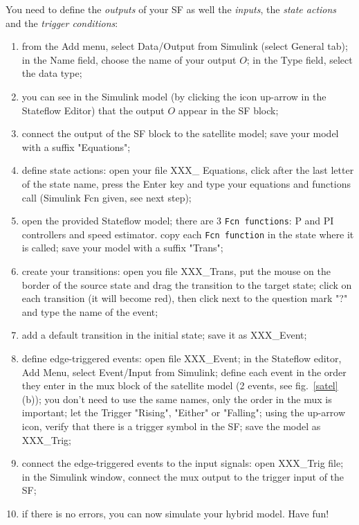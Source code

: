\documentclass[a4paper]{article}
\begin{document}
You need to define the \emph{outputs} of your SF as well the \emph{inputs}, 
the \emph{state actions} and the \emph{trigger conditions}:
\begin{enumerate}
\item from the Add menu, select Data/Output from Simulink (select General tab); in the Name field,
	choose the name of your output $O$; in the Type field, select the data type;%
\item you can see in the Simulink model (by clicking the icon up-arrow in the Stateflow Editor)
	that the output $O$ appear in the SF block;
\item connect the output of the SF block to the satellite model;%
	save your model with a suffix "Equations";
\item define state actions: open your file XXX\_ Equations, click after the last letter of the
	state name, press the Enter key and type your equations and functions call (Simulink Fcn given,
	see next step);
\item open the  provided Stateflow model; there are 3 {\tt Fcn functions}: P and PI controllers and 
	speed estimator. copy each {\tt Fcn function} in the state where it is called;
	save your model with a suffix "Trans";
\item create your transitions: open you file XXX\_Trans, put the mouse on the border of the source
	state and drag the transition to the target state;%
	click on each transition (it will become red), then click next to the question mark "?" and
	type the name of the event;%
\item add a default transition in the initial state;%
	save it as XXX\_Event;
\item define edge-triggered events: open file XXX\_Event; in the Stateflow editor, Add Menu, 
	select Event/Input from Simulink;%
	define each event in the order they enter in the mux block of the satellite model (2 events,
	see fig.~\ref{satel}(b)); you don't need to use the same names, only the order in the mux is
	important; let the Trigger "Rising", "Either" or "Falling"; using the up-arrow icon, verify
	that there is a trigger symbol in the SF; save the model as XXX\_Trig;
\item connect the edge-triggered events to the input signals:%
	open XXX\_Trig file; in the Simulink window, connect the mux output to the trigger input of 
	the SF;
\item if there is no errors, you can now simulate your hybrid model. Have fun!
\end{enumerate}
\end{document}
